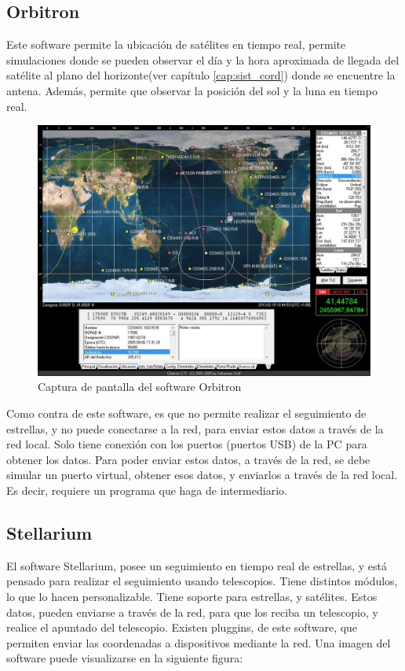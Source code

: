 \subsection{Orbitron}
Este software permite la ubicación de satélites en tiempo real, permite simulaciones donde se pueden observar el día y la hora aproximada de llegada del satélite al plano del horizonte(ver capítulo \ref{cap:sist_cord}) donde se encuentre la antena. 
Además, permite que observar la posición del sol y la luna en tiempo real. 

\begin{figure}[ht]
	\centering
	\includegraphics[scale=0.4]{orbitron}
	\caption{Captura de pantalla del software Orbitron }
\end{figure}

Como contra de este software, es que no permite realizar el seguimiento de estrellas, y no puede conectarse a la red, para enviar estos datos a través de la red local. Solo tiene conexión con los puertos (puertos USB) de la PC para obtener los datos. Para poder enviar estos datos, a través de la red, se debe simular un puerto virtual, obtener esos datos, y enviarlos a través de la red local. Es decir, requiere un programa que haga de intermediario. 

\subsection{Stellarium} 
El software Stellarium, posee un seguimiento en tiempo real de estrellas, y está pensado para realizar el seguimiento usando telescopios. Tiene distintos módulos, lo que lo hacen personalizable. Tiene soporte para estrellas, y satélites. Estos datos, pueden enviarse a través de la red, para que los reciba un telescopio, y realice el apuntado del telescopio. Existen pluggins, de este software, que permiten enviar las coordenadas a dispositivos mediante la red. Una imagen del software puede visualizarse en la siguiente figura:%

